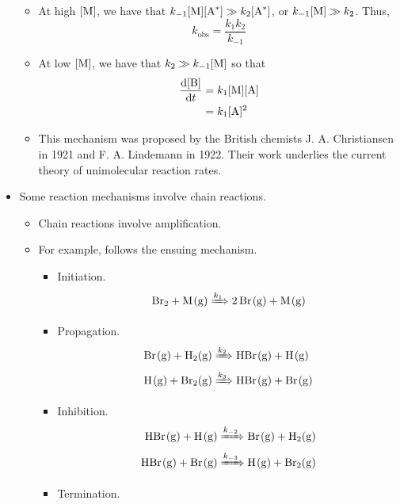 \documentclass[../notes.tex]{subfiles}
\begin{document}
\begin{itemize}
\begin{itemize}
        \item At high $[\ce{M}]$, we have that $k_{-1}[\ce{M}][\ce{A^*}]\gg k_2[\ce{A^*}]$, or $k_{-1}[\ce{M}]\gg k_2$. Thus,
        \begin{equation*}
            k_\text{obs} = \frac{k_1k_2}{k_{-1}}
        \end{equation*}
        \item At low $[\ce{M}]$, we have that $k_2\gg k_{-1}[\ce{M}]$ so that
        \begin{align*}
            \dv{[\ce{B}]}{t} &= k_1[\ce{M}][\ce{A}]\\
            &= k_1[\ce{A}]^2
        \end{align*}
        \item This mechanism was proposed by the British chemists J. A. Christiansen in 1921 and F. A. Lindemann in 1922. Their work underlies the current theory of unimolecular reaction rates.
    \end{itemize}
    \item Some reaction mechanisms involve chain reactions.
    \begin{itemize}
        \item Chain reactions involve amplification.
        \item For example,  follows the ensuing mechanism.
        \begin{itemize}
            \item Initiation.
            \begin{equation*}
                \ce{Br2 + M(g)} \xRightarrow{k_1} \ce{2Br(g) + M(g)}
            \end{equation*}
            \item Propagation.
            \begin{align*}
                \ce{Br(g) + H2(g)} &\xRightarrow{k_2} \ce{HBr(g) + H(g)}\\
                \ce{H(g) + Br2(g)} &\xRightarrow{k_3} \ce{HBr(g) + Br(g)}
            \end{align*}
            \item Inhibition.
            \begin{align*}
                \ce{HBr(g) + H(g)} &\xRightarrow{k_{-2}} \ce{Br(g) + H2(g)}\\
                \ce{HBr(g) + Br(g)} &\xRightarrow{k_{-3}} \ce{H(g) + Br2(g)}
            \end{align*}
            \item Termination.
            \begin{equation*}

\end{equation*}
\end{itemize}
\end{itemize}
\end{itemize}
\end{document}
